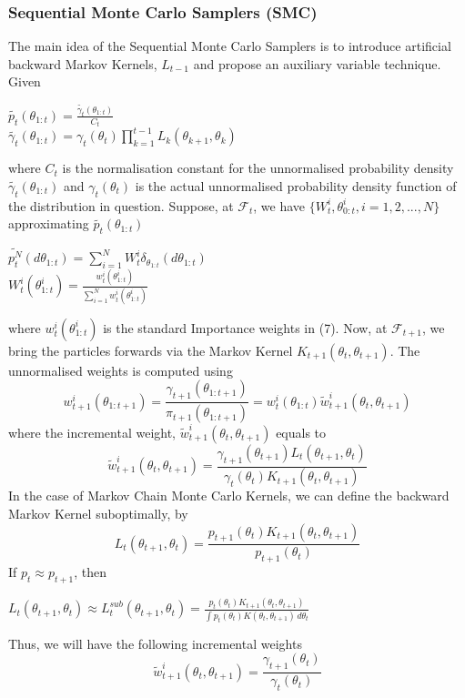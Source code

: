 \documentclass[12pt]{article}
\theoremstyle{definition}
\begin{document}
\subsubsection{Sequential Monte Carlo Samplers (SMC)}
The main idea of the Sequential Monte Carlo Samplers is to introduce artificial backward Markov Kernels, $L_{t-1}$ and propose an auxiliary variable technique. Given
\begin{center}
$\widetilde{p_{t}}(\theta_{1:t}) = \frac{\widetilde{\gamma_{t}}(\theta_{1:t})}{C_{t}}$\\
$\widetilde{\gamma_{t}}(\theta_{1:t}) = \gamma_{t}(\theta_{t})\prod_{k=1}^{t-1} L_{k}(\theta_{k+1},\theta_{k})$
\end{center}
where $C_{t}$ is the normalisation constant for the unnormalised probability density $\widetilde{\gamma_{t}}(\theta_{1:t})$ and $\gamma_{t}(\theta_{t})$ is the actual unnormalised probability density function of the distribution in question. Suppose, at $\mathcal{F}_{t}$, we have $\{W^{i}_{t},\theta_{0:t}^{i},i=1,2,...,N\}$ approximating $\widetilde{p_{t}}(\theta_{1:t})$
\begin{center}
$\widetilde{p_{t}^{N}}(d\theta_{1:t})=\sum_{i=1}^{N} W^{i}_{t} \delta_{\theta_{1:t}}(d\theta_{1:t})$\\
$W^{i}_{t}(\theta^{i}_{1:t}) = \frac{w^{i}_{t}(\theta^{i}_{1:t})}{\sum_{i=1}^{N} w^{i}_{t}(\theta^{i}_{1:t})}$
\end{center}
where $w_{t}^{i}(\theta_{1:t}^{i})$ is the standard Importance weights in (7). Now, at $\mathcal{F}_{t+1}$, we bring the particles forwards via the Markov Kernel $K_{t+1}(\theta_{t},\theta_{t+1})$. The unnormalised weights is computed using
\begin{equation}
w^{i}_{t+1}(\theta_{1:t+1}) = \frac{\gamma_{t+1}(\theta_{1:t+1})}{\pi_{t+1}(\theta_{1:t+1})} = w^{i}_{t}(\theta_{1:t})\widetilde{w}^{i}_{t+1}(\theta_{t},\theta_{t+1})
\end{equation}
where the incremental weight, $\widetilde{w}^{i}_{t+1}(\theta_{t},\theta_{t+1})$ equals to
\begin{equation}
\widetilde{w}^{i}_{t+1}(\theta_{t},\theta_{t+1}) = \frac{\gamma_{t+1}(\theta_{t+1})L_{t}(\theta_{t+1},\theta_{t})}{\gamma_{t}(\theta_{t})K_{t+1}(\theta_{t},\theta_{t+1})}
\end{equation}
In the case of Markov Chain Monte Carlo Kernels, we can define the backward Markov Kernel suboptimally, by
\begin{equation}
L_{t}(\theta_{t+1},\theta_{t}) = \frac{p_{t+1}(\theta_{t})K_{t+1}(\theta_{t},\theta_{t+1})}{p_{t+1}(\theta_{t})}
\end{equation}
If $p_{t} \approx p_{t+1}$, then
\begin{center}
$L_{t}(\theta_{t+1},\theta_{t})  \approx L^{sub}_{t}(\theta_{t+1},\theta_{t})  = \frac{p_{t}(\theta_{t})K_{t+1}(\theta_{t},\theta_{t+1})}{\int p_{t}(\theta_{t})K(\theta_{t},\theta_{t+1})\,d\theta_{t}}$
\end{center}
Thus, we will have the following incremental weights
\begin{equation}
\widetilde{w}_{t+1}^{i}(\theta_{t},\theta_{t+1}) = \frac{\gamma_{t+1}(\theta_{t})}{\gamma_{t}(\theta_{t})}
\end{equation}
\end{document}
